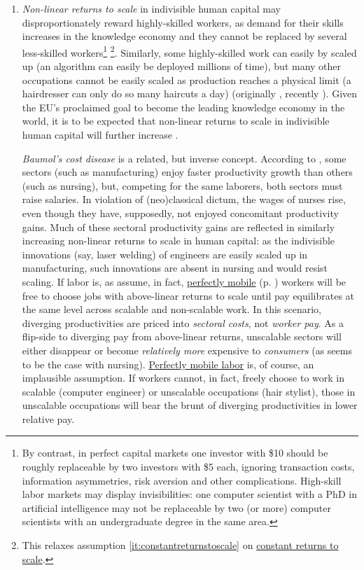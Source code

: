 \begin{enumerate}
	\item {} \label{it:non-linearreturns} \emph{Non-linear returns to scale} in indivisible human capital may disproportionately reward highly-skilled workers, as demand for their skills increases in the knowledge economy and they cannot be replaced by several less-skilled workers\footnote{
		By contrast, in perfect capital markets one investor with \$10 should be roughly replaceable by two investors with \$5 each, ignoring transaction costs, information asymmetries, risk aversion and other complications. High-skill labor markets may display invisibilities:  one computer scientist with a PhD in artificial intelligence may not be replaceable by two (or more) computer scientists with an undergraduate degree in the same area.} \footnote{
		This relaxes  assumption \ref{it:constantreturnstoscale} on \hyperref[it:constantreturnstoscale]{constant returns to scale}.}.
	Similarly, some highly-skilled work can easily by scaled up (an algorithm can  easily be deployed millions of time), but many other occupations cannot be easily scaled as production reaches a physical limit (a hairdresser can only do so many haircuts a day) (originally \citealt{Rosen1981}, recently \citealt{Taleb2007}). Given the \gls{EU}'s proclaimed goal to become the leading knowledge economy in the world, it is to be expected that non-linear returns to scale in indivisible human capital will further increase \citep{Commission2007}.
	
	\emph{Baumol's cost disease} is a related, but inverse concept. According to \cite{Baumol1965}, some sectors (such as  manufacturing) enjoy faster productivity growth than others (such as nursing), but, competing for the same laborers, both sectors must raise salaries. In violation of (neo)classical dictum, the wages of nurses rise, even though they have, supposedly, not enjoyed concomitant productivity gains. Much of these sectoral productivity gains are reflected in similarly increasing non-linear returns to scale in human capital: as the indivisible innovations (say, laser welding) of engineers are easily scaled up in manufacturing, such innovations are absent in nursing and would resist scaling. If labor is, as \cite{Baumol1965} assume, in fact, \hyperref[it:perfectfactormobility]{perfectly mobile} (p. \pageref{sec:perfectcompetition}) workers will be free to choose jobs with above-linear returns to scale until pay equilibrates at the same level across scalable and non-scalable work. In this scenario, diverging productivities are priced into \emph{sectoral costs}, not \emph{worker pay}. As a flip-side to diverging pay from above-linear returns, unscalable sectors will either disappear or become \emph{relatively more} expensive to \emph{consumers} (as seems to be the case with nursing). \hyperref[it:perfectfactormobility]{Perfectly mobile labor} is, of course, an implausible assumption. If workers cannot, in fact, freely choose to work in scalable (computer engineer) or unscalable occupations (hair stylist), those in unscalable occupations will bear the brunt of diverging productivities in lower relative pay. 
	

\end{enumerate}
